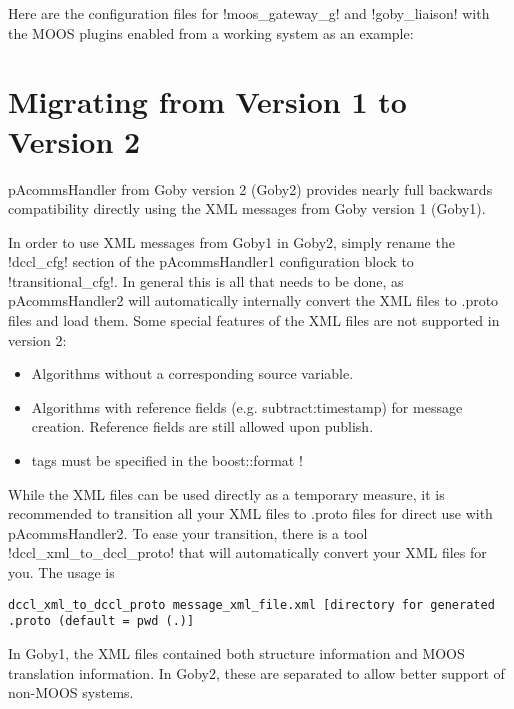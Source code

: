 Here are the configuration files for !moos_gateway_g! and !goby_liaison! with the MOOS plugins enabled from a working system as an example:

\resetbvlinenumber

\resetbvlinenumber


\section{Migrating from Version 1 to Version 2} \label{sec:gobyv1_migrate}

pAcommsHandler from Goby version 2 (Goby2) provides nearly full backwards compatibility directly using the XML messages from Goby version 1 (Goby1). 

In order to use XML messages from Goby1 in Goby2, simply rename the !dccl_cfg! section of the pAcommsHandler1 configuration block to !transitional_cfg!. In general this is all that needs to be done, as pAcommsHandler2 will automatically internally convert the XML files to .proto files and load them. Some special features of the XML files are not supported in version 2:

\begin{itemize}
\item Algorithms without a corresponding source variable.
\item Algorithms with reference fields (e.g. subtract:timestamp) for message creation. Reference fields are still allowed upon publish.
\item {} tags must be specified in the boost::format !%
\end{itemize}

While the XML files can be used directly as a temporary measure, it is recommended to transition all your XML files to .proto files for direct use with pAcommsHandler2. To ease your transition, there is a tool !dccl_xml_to_dccl_proto! that will automatically convert your XML files for you. The usage is 
\begin{verbatim}
dccl_xml_to_dccl_proto message_xml_file.xml [directory for generated .proto (default = pwd (.)]
\end{verbatim}

In Goby1, the XML files contained both structure information and MOOS translation information. In Goby2, these are separated to allow better support of non-MOOS systems. 

